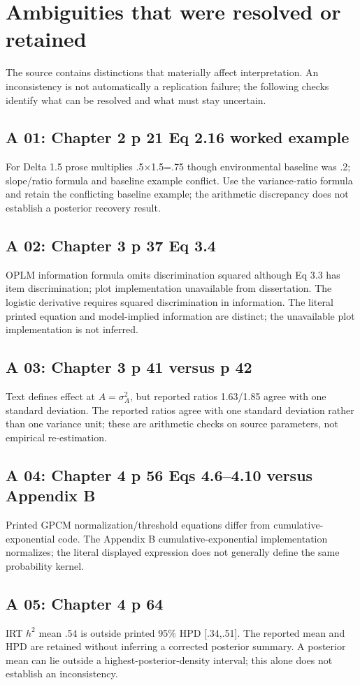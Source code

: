 \documentclass[11pt]{article}
\begin{document}
\section{Ambiguities that were resolved or retained}\label{sec:ambiguities}
The source contains distinctions that materially affect interpretation. An inconsistency is not automatically a replication failure; the following checks identify what can be resolved and what must stay uncertain.
\subsection{A 01: Chapter 2 p 21 Eq 2.16 worked example}
For Delta 1.5 prose multiplies .5$\times$1.5=.75 though environmental baseline was .2; slope/ratio formula and baseline example conflict. Use the variance-ratio formula and retain the conflicting baseline example; the arithmetic discrepancy does not establish a posterior recovery result.
\subsection{A 02: Chapter 3 p 37 Eq 3.4}
OPLM information formula omits discrimination squared although Eq 3.3 has item discrimination; plot implementation unavailable from dissertation. The logistic derivative requires squared discrimination in information. The literal printed equation and model-implied information are distinct; the unavailable plot implementation is not inferred.
\subsection{A 03: Chapter 3 p 41 versus p 42}
Text defines effect at $A=\sigma_A^2$, but reported ratios 1.63/1.85 agree with one standard deviation. The reported ratios agree with one standard deviation rather than one variance unit; these are arithmetic checks on source parameters, not empirical re-estimation.
\subsection{A 04: Chapter 4 p 56 Eqs 4.6--4.10 versus Appendix B}
Printed GPCM normalization/threshold equations differ from cumulative-exponential code. The Appendix B cumulative-exponential implementation normalizes; the literal displayed expression does not generally define the same probability kernel.
\subsection{A 05: Chapter 4 p 64}
IRT $h^2$ mean .54 is outside printed 95\% HPD [.34,.51]. The reported mean and HPD are retained without inferring a corrected posterior summary. A posterior mean can lie outside a highest-posterior-density interval; this alone does not establish an inconsistency.
\end{document}
